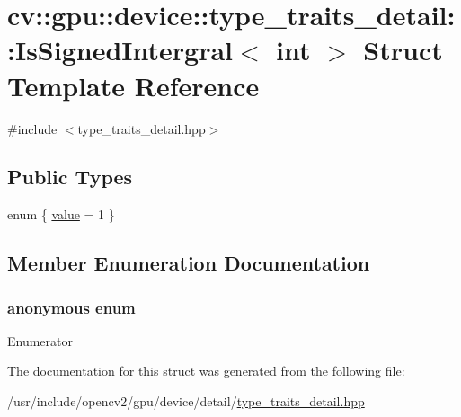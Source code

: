 \hypertarget{structcv_1_1gpu_1_1device_1_1type__traits__detail_1_1IsSignedIntergral_3_01int_01_4}{\section{cv\-:\-:gpu\-:\-:device\-:\-:type\-\_\-traits\-\_\-detail\-:\-:Is\-Signed\-Intergral$<$ int $>$ Struct Template Reference}
\label{structcv_1_1gpu_1_1device_1_1type__traits__detail_1_1IsSignedIntergral_3_01int_01_4}
}


{\ttfamily \#include $<$type\-\_\-traits\-\_\-detail.\-hpp$>$}

\subsection*{Public Types}
\begin{DoxyCompactItemize}
\item 
enum \{ \hyperlink{structcv_1_1gpu_1_1device_1_1type__traits__detail_1_1IsSignedIntergral_3_01int_01_4_ac1ccf22f59e9f70721a2f1d43f39d7e2a8a492bd0d9943a891a7997b548032c38}{value} = 1
 \}
\end{DoxyCompactItemize}


\subsection{Member Enumeration Documentation}
\hypertarget{structcv_1_1gpu_1_1device_1_1type__traits__detail_1_1IsSignedIntergral_3_01int_01_4_ac1ccf22f59e9f70721a2f1d43f39d7e2}{\subsubsection[{anonymous enum}]{\setlength{\rightskip}{0pt plus 5cm}anonymous enum}}\label{structcv_1_1gpu_1_1device_1_1type__traits__detail_1_1IsSignedIntergral_3_01int_01_4_ac1ccf22f59e9f70721a2f1d43f39d7e2}
\begin{Desc}
\item[Enumerator]\par
\begin{description}
\item[{\em 
\hypertarget{structcv_1_1gpu_1_1device_1_1type__traits__detail_1_1IsSignedIntergral_3_01int_01_4_ac1ccf22f59e9f70721a2f1d43f39d7e2a8a492bd0d9943a891a7997b548032c38}{value}\label{structcv_1_1gpu_1_1device_1_1type__traits__detail_1_1IsSignedIntergral_3_01int_01_4_ac1ccf22f59e9f70721a2f1d43f39d7e2a8a492bd0d9943a891a7997b548032c38}
}]\end{description}
\end{Desc}


The documentation for this struct was generated from the following file\-:\begin{DoxyCompactItemize}
\item 
/usr/include/opencv2/gpu/device/detail/\hyperlink{type__traits__detail_8hpp}{type\-\_\-traits\-\_\-detail.\-hpp}\end{DoxyCompactItemize}
